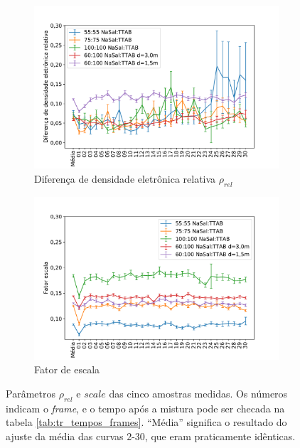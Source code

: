 	\begin{figure}
		\begin{subfigure}[t]{0.5\textwidth}
			\centering
			\includegraphics[width=\textwidth]{imagens/saxs/param_rho_rel}
			\caption{Diferença de densidade eletrônica relativa \(\rho_{rel}\)}
			\label{fig:param_rhorel}
		\end{subfigure} %
		\begin{subfigure}[t]{0.5\textwidth}
			\centering
			\includegraphics[width=\textwidth]{imagens/saxs/param_scale}
			\caption{Fator de escala}
			\label{fig:param_scale}
		\end{subfigure}
		\caption{Parâmetros \(\rho_{rel}\) e \(scale\) das cinco amostras medidas. Os números indicam o \emph{frame}, e o tempo após a mistura pode ser checada na tabela \ref{tab:tr_tempos_frames}. ``Média'' significa o resultado do ajuste da média das curvas 2-30, que eram praticamente idênticas.}
		\label{fig:params_scale_rhorel}
	\end{figure}

